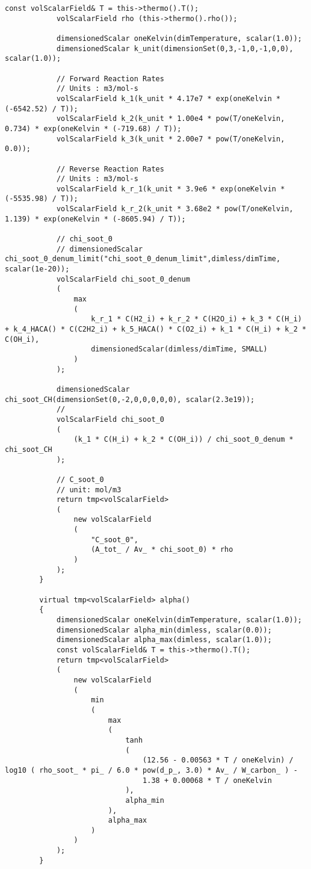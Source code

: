 \begin{lstlisting}[style=cpp,title=\texttt{laminarSoot.H},captionpos=t]
            const volScalarField& T = this->thermo().T();
            volScalarField rho (this->thermo().rho());

            dimensionedScalar oneKelvin(dimTemperature, scalar(1.0));
            dimensionedScalar k_unit(dimensionSet(0,3,-1,0,-1,0,0), scalar(1.0));

            // Forward Reaction Rates
            // Units : m3/mol-s
            volScalarField k_1(k_unit * 4.17e7 * exp(oneKelvin * (-6542.52) / T));
            volScalarField k_2(k_unit * 1.00e4 * pow(T/oneKelvin, 0.734) * exp(oneKelvin * (-719.68) / T));
            volScalarField k_3(k_unit * 2.00e7 * pow(T/oneKelvin, 0.0));

            // Reverse Reaction Rates
            // Units : m3/mol-s
            volScalarField k_r_1(k_unit * 3.9e6 * exp(oneKelvin * (-5535.98) / T));
            volScalarField k_r_2(k_unit * 3.68e2 * pow(T/oneKelvin, 1.139) * exp(oneKelvin * (-8605.94) / T));

            // chi_soot_0
            // dimensionedScalar chi_soot_0_denum_limit("chi_soot_0_denum_limit",dimless/dimTime, scalar(1e-20));
            volScalarField chi_soot_0_denum
            (
                max 
                (
                    k_r_1 * C(H2_i) + k_r_2 * C(H2O_i) + k_3 * C(H_i) + k_4_HACA() * C(C2H2_i) + k_5_HACA() * C(O2_i) + k_1 * C(H_i) + k_2 * C(OH_i),
                    dimensionedScalar(dimless/dimTime, SMALL)
                )
            );

            dimensionedScalar chi_soot_CH(dimensionSet(0,-2,0,0,0,0,0), scalar(2.3e19));
            // 
            volScalarField chi_soot_0
            (
                (k_1 * C(H_i) + k_2 * C(OH_i)) / chi_soot_0_denum * chi_soot_CH 
            );

            // C_soot_0
            // unit: mol/m3
            return tmp<volScalarField>
            (
                new volScalarField
                (
                    "C_soot_0",
                    (A_tot_ / Av_ * chi_soot_0) * rho
                )
            );
        }

        virtual tmp<volScalarField> alpha()
        {
            dimensionedScalar oneKelvin(dimTemperature, scalar(1.0));
            dimensionedScalar alpha_min(dimless, scalar(0.0));
            dimensionedScalar alpha_max(dimless, scalar(1.0));
            const volScalarField& T = this->thermo().T();
            return tmp<volScalarField>
            (
                new volScalarField
                (
                    min
                    (
                        max
                        (
                            tanh
                            (
                                (12.56 - 0.00563 * T / oneKelvin) / log10 ( rho_soot_ * pi_ / 6.0 * pow(d_p_, 3.0) * Av_ / W_carbon_ ) - 
                                1.38 + 0.00068 * T / oneKelvin
                            ),
                            alpha_min
                        ),
                        alpha_max
                    )
                )
            );
        }


\end{lstlisting}
